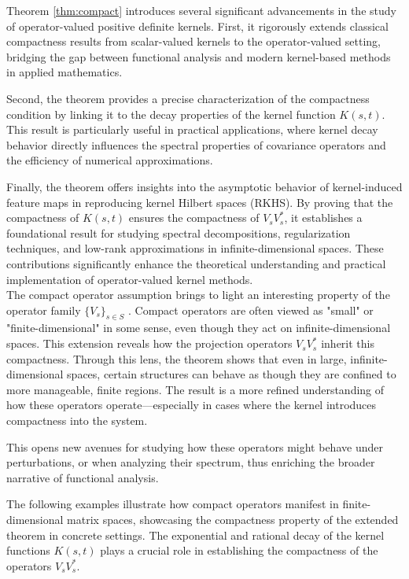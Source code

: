 \documentclass[11pt]{amsart}
\theoremstyle{definition}
\numberwithin{equation}{section}
\begin{document}
\noindent
Theorem \ref{thm:compact} introduces several significant advancements in the study of operator-valued positive definite kernels. First, it rigorously extends classical compactness results from scalar-valued kernels to the operator-valued setting, bridging the gap between functional analysis and modern kernel-based methods in applied mathematics.

Second, the theorem provides a precise characterization of the compactness condition by linking it to the decay properties of the kernel function $K(s, t)$. This result is particularly useful in practical applications, where kernel decay behavior directly influences the spectral properties of covariance operators and the efficiency of numerical approximations.

Finally, the theorem offers insights into the asymptotic behavior of kernel-induced feature maps in reproducing kernel Hilbert spaces (RKHS). By proving that the compactness of $K(s, t)$ ensures the compactness of $V_sV_s^*$, it establishes a foundational result for studying spectral decompositions, regularization techniques, and low-rank approximations in infinite-dimensional spaces. These contributions significantly enhance the theoretical understanding and practical implementation of operator-valued kernel methods.\\

\noindent
The compact operator assumption brings to light an interesting property of the operator family $\{V_s\}_{s\in S}$ . Compact operators are often viewed as "small" or "finite-dimensional" in some sense, even though they act on infinite-dimensional spaces. This extension reveals how the projection operators 
$V_sV^*_s$ inherit this compactness. Through this lens, the theorem shows that even in large, infinite-dimensional spaces, certain structures can behave as though they are confined to more manageable, finite regions. The result is a more refined understanding of how these operators operate—especially in cases where the kernel introduces compactness into the system.

This opens new avenues for studying how these operators might behave under perturbations, or when analyzing their spectrum, thus enriching the broader narrative of functional analysis.

The following examples illustrate how compact operators manifest in finite-dimensional matrix spaces, showcasing the compactness property of the extended theorem in concrete settings. The exponential and rational decay of the kernel functions $K(s,t)$ plays a crucial role in establishing the compactness of the operators $V_sV^*_s$.
\end{document}
